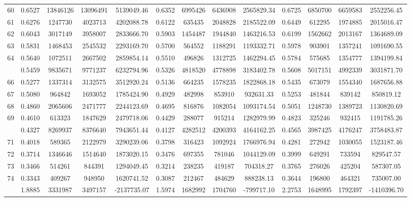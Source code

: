 \documentclass[
  12pt,
]{article}
\begin{document}
\begin{longtable}[t]{lcccccccccccc}
60 & 0.6527 & 13846126 & 13096491 & 5139049.46 & 0.6352 & 6995426 & 6436908 & 2565829.34 & 0.6725 & 6850700 & 6659583 & 2552256.45\\
61 & 0.6276 & 1247730 & 4023713 & 4202088.78 & 0.6122 & 635435 & 2048828 & 2185522.09 & 0.6449 & 612295 & 1974885 & 2015016.47\\
62 & 0.6043 & 3017149 & 3958007 & 2833666.70 & 0.5903 & 1454487 & 1944840 & 1463216.53 & 0.6199 & 1562662 & 2013167 & 1364689.09\\
63 & 0.5831 & 1468453 & 2545532 & 2293169.70 & 0.5700 & 564552 & 1188291 & 1193332.71 & 0.5978 & 903901 & 1357241 & 1091690.55\\
64 & 0.5640 & 1072511 & 2667502 & 2859854.14 & 0.5510 & 496826 & 1312725 & 1462294.45 & 0.5784 & 575685 & 1354777 & 1394199.84\\
\addlinespace
65 & 0.5459 & 9835671 & 9771237 & 6232794.96 & 0.5326 & 4818520 & 4778898 & 3183402.78 & 0.5608 & 5017151 & 4992339 & 3031871.70\\
66 & 0.5277 & 1337314 & 3132575 & 3512920.24 & 0.5136 & 664235 & 1578235 & 1822868.18 & 0.5435 & 673079 & 1554340 & 1687656.88\\
67 & 0.5080 & 964842 & 1693052 & 1785424.90 & 0.4929 & 482998 & 853910 & 932631.33 & 0.5253 & 481844 & 839142 & 850819.12\\
68 & 0.4860 & 2065606 & 2471777 & 2244123.69 & 0.4695 & 816876 & 1082054 & 1093174.54 & 0.5051 & 1248730 & 1389723 & 1130820.69\\
69 & 0.4610 & 613323 & 1847629 & 2479718.06 & 0.4429 & 288077 & 915214 & 1282979.99 & 0.4823 & 325246 & 932415 & 1191785.26\\
\addlinespace
70 & 0.4327 & 8269937 & 8376640 & 7943651.44 & 0.4127 & 4282512 & 4200393 & 4164162.25 & 0.4565 & 3987425 & 4176247 & 3758483.87\\
71 & 0.4018 & 589365 & 2122979 & 3290239.06 & 0.3798 & 316423 & 1092924 & 1766976.94 & 0.4281 & 272942 & 1030055 & 1523187.46\\
72 & 0.3714 & 1346646 & 1514640 & 1873020.15 & 0.3476 & 697355 & 781046 & 1044129.09 & 0.3999 & 649291 & 733594 & 829547.57\\
73 & 0.3466 & 514261 & 844391 & 1294049.45 & 0.3214 & 238235 & 419187 & 704318.27 & 0.3765 & 276026 & 425204 & 587307.05\\
74 & 0.3343 & 409267 & 948950 & 1620741.52 & 0.3087 & 212467 & 484629 & 888238.13 & 0.3644 & 196800 & 464321 & 735007.00\\
\addlinespace
75 & 1.8885 & 3331987 & 3497157 & -2137735.07 & 1.5974 & 1682992 & 1704760 & -799717.10 & 2.2753 & 1648995 & 1792397 & -1410396.70\\*
\end{longtable}
\endgroup{}
\end{document}
